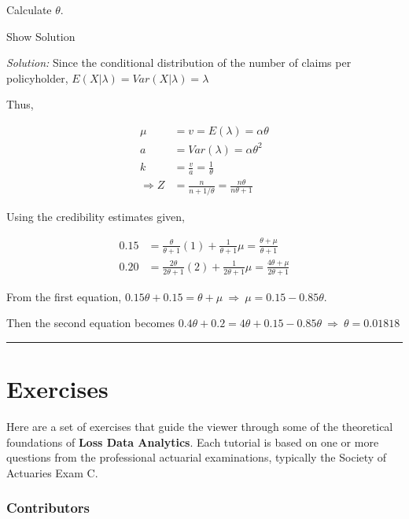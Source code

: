 \documentclass[]{book}
\theoremstyle{definition}
\theoremstyle{definition}
\theoremstyle{definition}
\theoremstyle{remark}
\begin{document}
Calculate \(\theta\).

Show Solution

\hypertarget{toggleExamC215}{}
\emph{Solution:} Since the conditional distribution of the number of
claims per policyholder, \(E(X|\lambda)=Var(X|\lambda)=\lambda\)

Thus,

\[\begin{aligned}
\mu &= v = E(\lambda) = \alpha\theta \\
a &= Var(\lambda) = \alpha\theta^2 \\
k &= \frac{v}{a} = \frac{1}{\theta} \\
\Rightarrow Z &= \frac{n}{n+1/\theta} = \frac{n\theta}{n\theta+1}
\end{aligned}\]

Using the credibility estimates given,

\[\begin{aligned}
0.15 &= \frac{\theta}{\theta + 1}(1) + \frac{1}{\theta + 1}\mu = \frac{\theta + \mu}{\theta + 1} \\
0.20 &= \frac{2\theta}{2\theta+1}(2) + \frac{1}{2\theta+1}\mu = \frac{4\theta+\mu}{2\theta+1}
\end{aligned}\]

From the first equation,
\(0.15\theta + 0.15 = \theta + \mu \ \Rightarrow \ \mu = 0.15- 0.85\theta\).

Then the second equation becomes
\(0.4\theta + 0.2 = 4\theta + 0.15 - 0.85\theta \ \Rightarrow \ \theta=0.01818\)

\begin{center}\rule{0.5\linewidth}{\linethickness}\end{center}

\section{Exercises}\label{exercises-2}

Here are a set of exercises that guide the viewer through some of the
theoretical foundations of \textbf{Loss Data Analytics}. Each tutorial
is based on one or more questions from the professional actuarial
examinations, typically the Society of Actuaries Exam C.

\subsubsection*{Contributors}\label{contributors-1}
\end{document}

